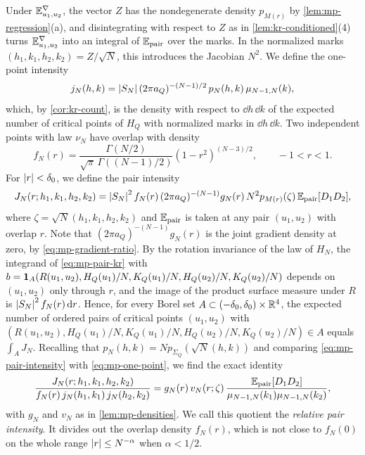 Under $\mathbb E^\nabla_{u_1,u_2}$, the vector $Z$ has the nondegenerate density $p_{M(r)}$ by \cref{lem:mp-regression}(a), and disintegrating with respect to $Z$ as in \cref{lem:kr-conditioned}(4) turns $\mathbb E^\nabla_{u_1,u_2}$ into an integral of $\mathbb E_{\mathrm{pair}}$ over the marks. In the normalized marks $(h_1,k_1,h_2,k_2)=Z/\sqrt N$, this introduces the Jacobian $N^2$. We define the one-point intensity
\begin{equation}\label{eq:mp-one-point}
j_N(h,k)=\left|S_N\right|(2\pi a_Q)^{-(N-1)/2}\,p_N(h,k)\,\mu_{N-1,N}(k),
\end{equation}
which, by \cref{cor:kr-count}, is the density with respect to $\dd h\,\dd k$ of the expected number of critical points of $H_Q$ with normalized marks in $\dd h\,\dd k$. Two independent points with law $\nu_N$ have overlap with density
\begin{equation}\label{eq:mp-overlap-density}
f_N(r)=\frac{\Gamma(N/2)}{\sqrt\pi\,\Gamma((N-1)/2)}(1-r^2)^{(N-3)/2},\qquad -1<r<1.
\end{equation}
For $\left|r\right|<\delta_0$, we define the pair intensity
\begin{equation}\label{eq:mp-pair-intensity}
J_N(r;h_1,k_1,h_2,k_2)=\left|S_N\right|^2f_N(r)\,(2\pi a_Q)^{-(N-1)}g_N(r)\,N^2p_{M(r)}(\zeta)\,\mathbb E_{\mathrm{pair}}[D_1D_2],
\end{equation}
where $\zeta=\sqrt N(h_1,k_1,h_2,k_2)$ and $\mathbb E_{\mathrm{pair}}$ is taken at any pair $(u_1,u_2)$ with overlap $r$. Note that $(2\pi a_Q)^{-(N-1)}g_N(r)$ is the joint gradient density at zero, by \eqref{eq:mp-gradient-ratio}. By the rotation invariance of the law of $H_N$, the integrand of \eqref{eq:mp-pair-kr} with $b=\mathbf 1_A(R(u_1,u_2),H_Q(u_1)/N,K_Q(u_1)/N,H_Q(u_2)/N,K_Q(u_2)/N)$ depends on $(u_1,u_2)$ only through $r$, and the image of the product surface measure under $R$ is $\left|S_N\right|^2f_N(r)\,\mathrm d r$. Hence, for every Borel set $A\subset(-\delta_0,\delta_0)\times\mathbb R^4$, the expected number of ordered pairs of critical points $(u_1,u_2)$ with $(R(u_1,u_2),H_Q(u_1)/N,K_Q(u_1)/N,H_Q(u_2)/N,K_Q(u_2)/N)\in A$ equals $\int_AJ_N$. Recalling that $p_N(h,k)=Np_{\Sigma_Q}(\sqrt N(h,k))$ and comparing \eqref{eq:mp-pair-intensity} with \eqref{eq:mp-one-point}, we find the exact identity
\begin{equation}\label{eq:mp-ratio-identity}
\frac{J_N(r;h_1,k_1,h_2,k_2)}{f_N(r)\,j_N(h_1,k_1)\,j_N(h_2,k_2)}=g_N(r)\,v_N(r;\zeta)\,\frac{\mathbb E_{\mathrm{pair}}[D_1D_2]}{\mu_{N-1,N}(k_1)\mu_{N-1,N}(k_2)},
\end{equation}
with $g_N$ and $v_N$ as in \cref{lem:mp-densities}. We call this quotient the \emph{relative pair intensity}. It divides out the overlap density $f_N(r)$, which is not close to $f_N(0)$ on the whole range $\left|r\right|\le N^{-\alpha}$ when $\alpha<1/2$.

